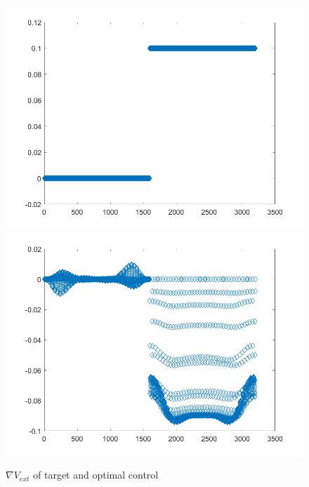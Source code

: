 \documentclass[11pt, a4paper]{article}
\theoremstyle{definition}
\begin{document}
	\begin{figure}[h]
		\centering
		\includegraphics[scale=0.35]{V1.png}
		\includegraphics[scale=0.35]{W1.png}
		\caption{$\nabla V_{ext}$ of target and optimal control} 
		\label{F1}
	\end{figure}
\end{document}
